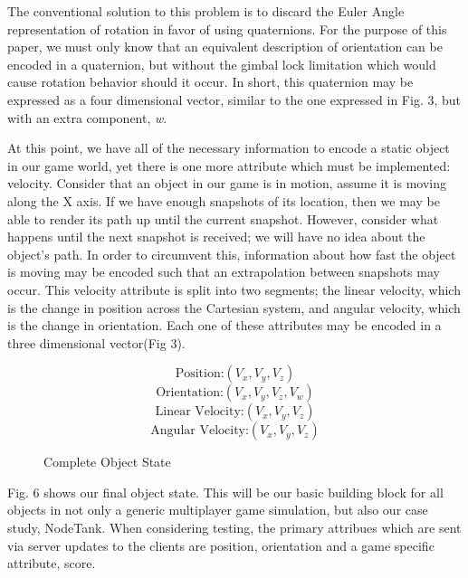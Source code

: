 \documentclass[conference]{IEEEtran}
\begin{document}
The conventional solution to this problem is to discard the Euler Angle representation of rotation in favor of using quaternions. 
For the purpose of this paper, we must only know that an equivalent description of orientation can be encoded in a quaternion,
but without the gimbal lock limitation which would cause rotation behavior should it occur. In short, this quaternion may be expressed as a four dimensional
vector, similar to the one expressed in Fig. 3, but with an extra component, \textit{w}. 

At this point, we have all of the necessary information to encode a static object in our game world, yet there is one more attribute which
must be implemented: velocity. Consider that an object in our game is in motion, assume it is moving along the X axis. If we have enough snapshots of its location,
then we may be able to render its path up until the current snapshot. However, consider what happens until the next snapshot is received; we will have no idea about the object's path. 
In order to circumvent this, information about how fast the object is moving may be encoded such that an extrapolation between snapshots may occur. This velocity attribute 
is split into two segments; the linear velocity, which is the change in position across the Cartesian system, and angular velocity, which is the change in orientation. 
Each one of these attributes may be encoded in a three dimensional vector(Fig 3).

\begin{figure}[htbp]
\begin{equation}
\text {Position:} (V_{x}, V_{y}, V_{z})
\end{equation}
\begin{equation}
\text {Orientation:} (V_{x}, V_{y}, V_{z}, V_{w})
\end{equation}
\begin{equation}
\text {Linear Velocity:} (V_{x}, V_{y}, V_{z})
\end{equation}
\begin{equation}
\text {Angular Velocity:} (V_{x}, V_{y}, V_{z})
\end{equation}
\caption{Complete Object State}
\end{figure}

Fig. 6 shows our final object state. This will be our basic building block for all objects in not only a generic multiplayer game simulation, 
but also our case study, NodeTank. When considering testing, the primary attribues which are sent via server updates to the clients are position,
orientation and a game specific attribute, score. 
\end{document}
